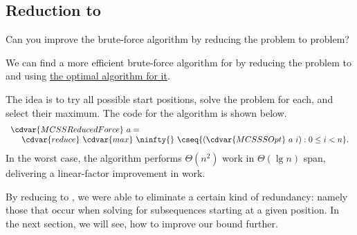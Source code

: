 \subsection{Reduction to \MCSSS{}}
\label{sec:mcss::reduction-to}

\begin{cluster}
\label{grp:tch:mcss::improve}

\begin{teachask}
\label{tch:mcss::improve}
Can you improve the brute-force algorithm by reducing the \MCSS{}
problem to \MCSSS{} problem?

\end{teachask}
\end{cluster}

\begin{cluster}
\label{grp:alg:mcss::reduction::mcss-red-mcsss}

\begin{algorithm}
\label{alg:mcss::reduction::mcss-red-mcsss}

We can find a more efficient brute-force algorithm for \MCSS{} by
reducing the problem to \MCSSS{} and
using \href{alg:mcss::reduction::mcsss}{the optimal algorithm for it}.

The idea is to try all possible start positions, solve the \MCSSS{}
problem for each, and select their maximum.
The code for the algorithm is shown below.
\[
\begin{array}{l}
\cdvar{MCSSReducedForce}~a = 
\\
~~~~\cdvar{reduce}~\cdvar{max}~\ninfty{}~\cseq{(\cdvar{MCSSSOpt}~a~i) : 0 \le i < n}.
\end{array}
\]
In the worst case, the algorithm performs $\Theta(n^2)$ work in
$\Theta(\lg{n})$ span, delivering a linear-factor improvement in
work.

\end{algorithm}
\end{cluster}

\begin{cluster}
\label{grp:rmrk:mcss::reducing}

\begin{remark}
\label{rmrk:mcss::reducing}
By reducing \MCSS{} to \MCSSS{}, we were able to eliminate a certain
kind of redundancy: namely those that occur when solving for
subsequences starting at a given position.
In the next section, we will see, how to improve our bound further.

\end{remark}
\end{cluster}



